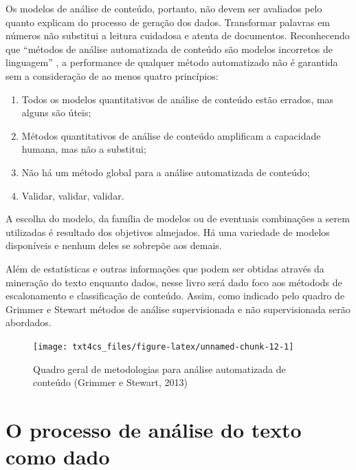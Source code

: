 \documentclass[]{book}
\begin{document}
Os modelos de análise de conteúdo, portanto, não devem ser avaliados pelo quanto explicam do processo de geração dos dados. Transformar palavras em números não substitui a leitura cuidadosa e atenta de documentos. Reconhecendo que ``métodos de análise automatizada de conteúdo são modelos incorretos de linguagem'' \citep[p.~2]{grimmer_text_2013}, a performance de qualquer método automatizado não é garantida sem a consideração de ao menos quatro princípios:

\begin{enumerate}
\def\labelenumi{\arabic{enumi}.}
\item
  Todos os modelos quantitativos de análise de conteúdo estão errados, mas alguns são úteis;
\item
  Métodos quantitativos de análise de conteúdo amplificam a capacidade humana, mas não a substitui;
\item
  Não há um método global para a análise automatizada de conteúdo;
\item
  Validar, validar, validar.
\end{enumerate}

A escolha do modelo, da família de modelos ou de eventuais combinações a serem utilizadas é resultado dos objetivos almejados. Há uma variedade de modelos disponíveis e nenhum deles se sobrepõe aos demais.

Além de estatísticas e outras informações que podem ser obtidas através da mineração do texto enquanto dados, nesse livro será dado foco aos métodods de escalonamento e classificação de conteúdo. Assim, como indicado pelo quadro de Grimmer e Stewart \citeyearpar{grimmer_text_2013} métodos de análise supervisionada e não supervisionada serão abordados.

\begin{figure}

{\centering \texttt{[image: txt4cs\_files/figure-latex/unnamed-chunk-12-1]} 

}

\caption{Quadro geral de metodologias para análise automatizada de conteúdo (Grimmer e Stewart, 2013)}\label{fig:unnamed-chunk-12}
\end{figure}

\hypertarget{o-processo-de-anuxe1lise-do-texto-como-dado}{%
\section{O processo de análise do texto como dado}\label{o-processo-de-anuxe1lise-do-texto-como-dado}}
\end{document}
